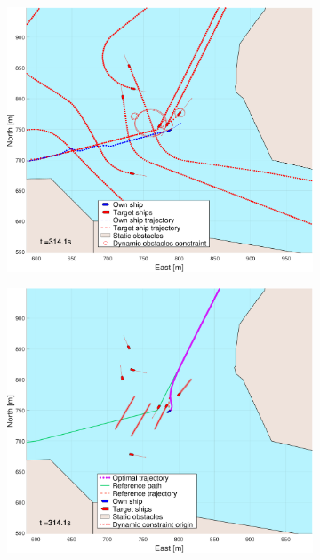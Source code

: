 \begin{figure}[ht!]
\begin{subfigure}[b]{0.494\textwidth}
        \subcaption{}
    \end{subfigure}
    \hfill
    \\
    \begin{subfigure}[b]{0.494\textwidth}
        \centering
        \includegraphics[width=\textwidth]{Images/NewFigures/Trheimfjord/_Simple_1fig1_time=315}
        \subcaption{}
    \end{subfigure}
    \hfill
    \begin{subfigure}[b]{0.494\textwidth}
        \centering
        \includegraphics[width=\textwidth]{Images/NewFigures/Trheimfjord/_Simple_1fig999_time=315}

\end{subfigure}
\end{figure}
